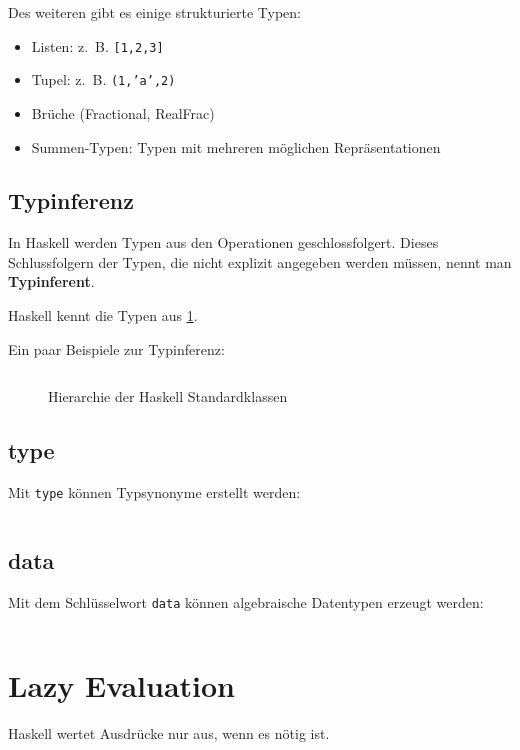 Des weiteren gibt es einige strukturierte Typen:
\begin{itemize}
  \item Listen: z.~B. \texttt{[1,2,3]}
  \item Tupel: z.~B. \texttt{(1,'a',2)}
  \item Brüche (Fractional, RealFrac)
  \item Summen-Typen: Typen mit mehreren möglichen Repräsentationen
\end{itemize}

\subsection{Typinferenz}
In Haskell werden Typen aus den Operationen geschlossfolgert. Dieses
Schlussfolgern der Typen, die nicht explizit angegeben werden müssen,
nennt man \textbf{Typinferent}.


Haskell kennt die Typen aus \cref{fig:haskell-type-hierarchy}.

Ein paar Beispiele zur Typinferenz:
\inputminted[numbersep=5pt, tabsize=4]{haskell}{scripts/haskell/typinferenz.sh}

\begin{figure}[htp]
    \centering
    \resizebox{0.9\linewidth}{!}{}
    \caption{Hierarchie der Haskell Standardklassen}
    \label{fig:haskell-type-hierarchy}
\end{figure}

\subsection{type}%
Mit \texttt{type} können Typsynonyme erstellt werden:

\inputminted[numbersep=5pt, tabsize=4]{haskell}{scripts/haskell/alt-types.hs}

\subsection{data}%
Mit dem Schlüsselwort \texttt{data} können algebraische Datentypen
erzeugt werden:

\inputminted[numbersep=5pt, tabsize=4]{haskell}{scripts/haskell/data-example.hs}

\section{Lazy Evaluation}%
Haskell wertet Ausdrücke nur aus, wenn es nötig ist.

